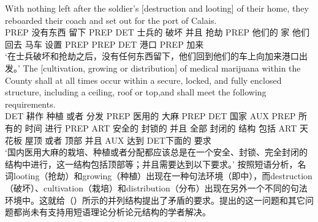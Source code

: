 \eal
\ex 
\gll With nothing left after the soldier's [destruction and looting] of their home, they reboarded their coach and set out for the port of Calais.\\
    PREP 没有东西 留下 PREP DET 士兵的 破坏 并且 抢劫 PREP 他们的 家 他们 回去 马车 设置 PREP PREP DET 港口 PREP 加来\\
\glt `在士兵破坏和抢劫之后，没有任何东西留下，他们回到他们的车上向加来港口出发。' 
\ex  
\gll The [cultivation, growing or distribution] of medical marijuana within the County shall at all times occur within a secure, locked, and fully enclosed structure, including a ceiling, roof or top,and shall meet the following requirements.\\
    DET  耕作 种植 或者 分发 PREP 医用的 大麻 PREP DET 国家 AUX PREP 所有的 时间 进行 PREP ART 安全的 封锁的 并且 全部 封闭的 结构 包括 ART 天花板 屋顶 或者 顶部 并且 AUX 达到 DET下面的 要求\\
\glt `国内医用大麻的栽培、种植或者分配都应该总是在一个安全、封锁、完全封闭的结构中进行，这一结构包括顶部等；并且需要达到以下要求。' 
\zl
    按照短语分析，名词looting（抢劫）和growing（种植）出现在一种句法环境（即\vPc 中），而destruction（破坏）、cultivation（栽培）和distribution（分布）出现在另外一个不同的句法环境中。这就给（）所示的并列结构提出了矛盾的要求。\citet{Wechsler2008a}提出的这一问题和其它问题都尚未有支持用短语理论分析论元结构的学者解决。
